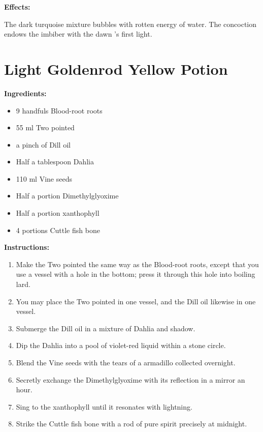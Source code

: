 \documentclass{article}
\begin{document}
\textbf{Effects:}

The dark turquoise mixture bubbles with rotten energy of water. The concoction endows the imbiber with the dawn 's first light.

\newpage
\section*{Light Goldenrod Yellow Potion}

\textbf{Ingredients:}

\begin{itemize}
  \item 9 handfuls Blood-root roots
  \item 55 ml Two pointed
  \item a pinch of Dill oil
  \item Half a tablespoon Dahlia
  \item 110 ml Vine seeds
  \item Half a portion Dimethylglyoxime
  \item Half a portion xanthophyll
  \item 4 portions Cuttle fish bone
\end{itemize}

\textbf{Instructions:}

\begin{enumerate}
  \item Make the Two pointed the same way as the Blood-root roots, except that you use a vessel with a hole in the bottom; press it through this hole into boiling lard.
  \item You may place the Two pointed in one vessel, and the Dill oil likewise in one vessel.
  \item Submerge the Dill oil in a mixture of Dahlia and shadow.
  \item Dip the Dahlia into a pool of violet-red liquid within a stone circle.
  \item Blend the Vine seeds with the tears of a armadillo collected overnight.
  \item Secretly exchange the Dimethylglyoxime with its reflection in a mirror an hour.
  \item Sing to the xanthophyll until it resonates with lightning.
  \item Strike the Cuttle fish bone with a rod of pure spirit precisely at midnight.
\end{enumerate}
\end{document}
